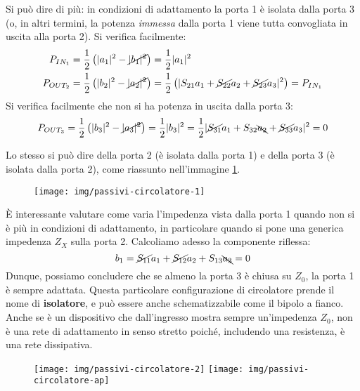 Si può dire di più: in condizioni di adattamento la porta 1 è isolata dalla porta 3 (o, in altri termini, la potenza \textit{immessa} dalla porta 1 viene tutta convogliata in uscita alla porta 2). Si verifica facilmente:
\begin{align*}
P_{IN_1} &= \frac{1}{2} \left( |a_1|^2-\cancel{|b_1|^2}\right)
= \frac{1}{2} |a_1|^2\\
P_{OUT_2} &= \frac{1}{2} \left( |b_2|^2-\cancel{|a_2|^2}\right)
= \frac{1}{2} \left( |S_{21}a_1+\cancel{S_{22}}a_2+\cancel{S_{23}}a_3|^2 \right)
= P_{IN_1}
\end{align*}
Si verifica facilmente che non si ha potenza in uscita dalla porta 3:
\[
P_{OUT_3} = \frac{1}{2} \left( |b_3|^2-\cancel{|a_3|^2}\right)
= \frac{1}{2}|b_3|^2
= \frac{1}{2}|\cancel{S_{31}}a_1 + S_{32}\bcancel{a_2} + \cancel{S_{33}}a_3|^2 = 0
\]

Lo stesso si può dire della porta 2 (è isolata dalla porta 1) e della porta 3 (è isolata dalla porta 2), come riassunto nell'immagine \ref{fig:passivi-circolatore-1}.
\begin{figure}[tbh]
	\centering
	\texttt{[image: img/passivi-circolatore-1]}
	\caption{}
	\label{fig:passivi-circolatore-1}
\end{figure}

%
%

È interessante valutare come varia l'impedenza vista dalla porta 1 quando non si è più in condizioni di adattamento, in particolare quando si pone una generica impedenza $Z_X$ sulla porta 2. Calcoliamo adesso la componente riflessa:
\[b_1 = \cancel{S_{11}}a_1 +\cancel{S_{12}}a_2+S_{13}\bcancel{a_3} = 0 \]
Dunque, possiamo concludere che se almeno la porta 3 è chiusa su $Z_0$, la porta 1 è sempre adattata.
Questa particolare configurazione di circolatore prende il nome di \textbf{isolatore}, e può essere anche schematizzabile come il bipolo a fianco. Anche se è un dispositivo che dall'ingresso mostra sempre un'impedenza $Z_0$, non è una rete di adattamento in senso stretto poiché, includendo una resistenza, è una rete dissipativa.

\begin{figure}[bph]
	\centering
	\texttt{[image: img/passivi-circolatore-2]}
	\texttt{[image: img/passivi-circolatore-ap]}
	\caption{}
	\label{fig:passivi-circolatore-2}
\end{figure}



